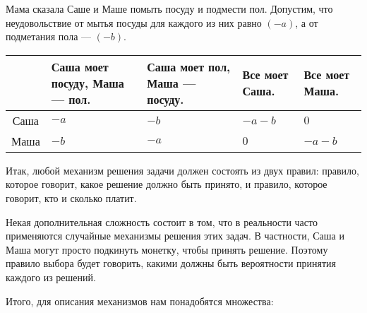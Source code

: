 \begin{myex} \label{sm_posuda} Мама сказала Саше и Маше помыть посуду и подмести пол. Допустим, что неудовольствие от мытья посуды для каждого из них равно $ (-a) $, а от подметания пола — $ (-b) $.

\begin{tabular}{c|p{3 cm}p{3 cm}p{3 cm}p{3 cm}}
& Саша моет посуду, Маша — пол. & Саша моет пол, Маша — посуду. & Все моет Саша. & Все моет Маша. \\
\hline
Саша & $ -a $ & $ -b $ & $ -a-b $ & $ 0 $ \\
Маша & $ -b $ & $ -a $ & $ 0 $ & $ -a-b $ \\
\end{tabular}

\end{myex}


Итак, любой механизм решения задачи должен состоять из двух правил: правило, которое говорит, какое решение должно быть принято, и правило, которое говорит, кто и сколько платит.

Некая дополнительная сложность состоит в том, что в реальности часто применяются случайные механизмы решения этих задач. В частности, Саша и Маша могут просто подкинуть монетку, чтобы принять решение. Поэтому правило выбора будет говорить, какими должны быть вероятности принятия каждого из решений.

Итого, для описания механизмов нам понадобятся множества:


